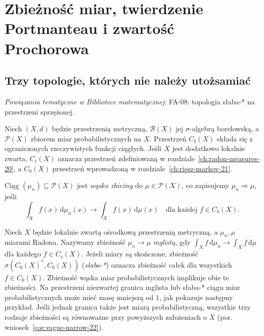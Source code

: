 \chapter[Zbieżność miar i twierdzenie Prochorowa]{Zbieżność miar, twierdzenie Portmanteau i zwartość Prochorowa}
\label{ch:weak-measures-22}

\providecommand{\atlasref}[2]{#2}


\section{Trzy topologie, których nie należy utożsamiać}

\noindent\emph{Powiązania tematyczne w Bibliotece matematycznej:} \atlasref{FA-08::def:slaba-gwiazdka}{FA-08: topologia słaba-* na przestrzeni sprzężonej}.

Niech $(X,d)$ będzie przestrzenią metryczną,
$\mathcal B(X)$ jej $\sigma$-algebrą borelowską,
a $\mathcal P(X)$ zbiorem miar probabilistycznych na $X$.
Przestrzeń $C_b(X)$ składa się z ograniczonych rzeczywistych
funkcji ciągłych. Jeśli $X$ jest dodatkowo lokalnie zwarta,
$C_c(X)$ oznacza przestrzeń zdefiniowaną w
rozdziale~\ref{ch:radon-measures-20}, a $C_0(X)$
przestrzeń wprowadzoną w rozdziale~\ref{ch:riesz-markov-21}.

\begin{definicja}
\label{def:narrow-measures-22}
Ciąg $(\mu_n)\subseteq\mathcal P(X)$ jest
\emph{wąsko zbieżny} do $\mu\in\mathcal P(X)$,
co zapisujemy $\mu_n\Rightarrow\mu$, jeśli
\begin{equation}\label{eq:narrow-22}
 \int_X f(x)\,\mathrm d\mu_n(x)
 \longrightarrow\int_X f(x)\,\mathrm d\mu(x)
 \quad\text{dla każdej }f\in C_b(X).
\end{equation}
\end{definicja}

\begin{definicja}
\label{def:vague-weakstar-22}
Niech $X$ będzie lokalnie zwartą ośrodkową przestrzenią
metryczną, a $\mu_n,\mu$ miarami Radona.
Nazywamy zbieżność $\mu_n\to\mu$ \emph{mglistą},
gdy $\int_Xf\,\mathrm d\mu_n\to\int_Xf\,\mathrm d\mu$
dla każdego $f\in C_c(X)$.
Jeżeli miary są skończone, zbieżność
$\sigma(C_0(X)^*,C_0(X))$ (\emph{słaba-*})
oznacza zbieżność całek dla wszystkich $f\in C_0(X)$.
Zbieżność wąska miar probabilistycznych implikuje
obie te zbieżności. Na przestrzeni niezwartej granica
mglista lub słaba-* ciągu miar probabilistycznych
może mieć masę mniejszą od $1$, jak pokazuje następny
przykład. Jeśli jednak granica także jest miarą
probabilistyczną, wszystkie trzy rodzaje zbieżności
są równoważne przy powyższych założeniach o $X$
(por. wniosek~\ref{cor:vague-narrow-22}).
\end{definicja}

